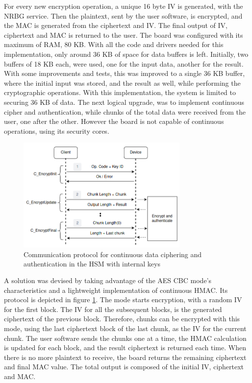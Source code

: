 For every new encryption operation, a unique 16 byte \ac{IV} is generated, with the \ac{NRBG} service.
Then the plaintext, sent by the user software, is encrypted, and the MAC is generated from the ciphertext and IV. The final output of IV, ciphertext and MAC is returned to the user.
The board was configured with its maximum of RAM, 80 KB. With all the code and drivers needed for this implementation, only around 36 KB of space for data buffers is left. Initially, two buffers of 18 KB each, were used, one for the input data, another for the result. With some improvements and tests, this was improved to a single 36 KB buffer, where the initial input was stored, and the result as well, while performing the cryptographic operations. With this implementation, the system is limited to securing 36 KB of data. The next logical upgrade, was to implement continuous cipher and authentication, while chunks of the total data were received from the user, one after the other. However the board is not capable of continuous operations, using its security cores.
\begin{figure}[h!]
	\centering
	\includegraphics[width=0.75\textwidth]{./Images/data-exchange-chunks.png}
	\caption{Communication protocol for continuous data ciphering and authentication in the HSM with internal keys}
	\label{fig:protocol:data-exchange-chunks}
\end{figure}
A solution was devised by taking advantage of the AES \ac{CBC} mode's characteristics and a lightweight implementation of continuous HMAC. Its protocol is depicted in figure \ref{fig:protocol:data-exchange-chunks}. The mode starts encryption, with a random IV for the first block. The IV for all the subsequent blocks, is the generated ciphertext of the previous block. Therefore, chunks can be encrypted with this mode, using the last ciphertext block of the last chunk, as the IV for the current chunk. The user software sends the chunks one at a time, the HMAC calculation is updated for each block, and the result ciphertext is returned each time. When there is no more plaintext to receive, the board returns the remaining ciphertext and final MAC value. The total output is composed of the initial IV, ciphertext and MAC.
